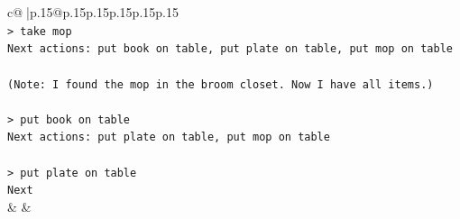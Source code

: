 \documentclass{article}
\begin{document}
{\begin{supertabular}{c@{$\;$}|p{.15\linewidth}@{}p{.15\linewidth}p{.15\linewidth}p{.15\linewidth}p{.15\linewidth}p{.15\linewidth}}
{{{\\ 
\texttt{> take mop  } \\
\texttt{Next actions: put book on table, put plate on table, put mop on table  } \\
\\ 
\texttt{(Note: I found the mop in the broom closet. Now I have all items.)  } \\
\\ 
\texttt{> put book on table  } \\
\texttt{Next actions: put plate on table, put mop on table  } \\
\\ 
\texttt{> put plate on table  } \\
\texttt{Next} \\
            }
        }
    }
    & & \\ \\


\end{supertabular}}
\end{document}
